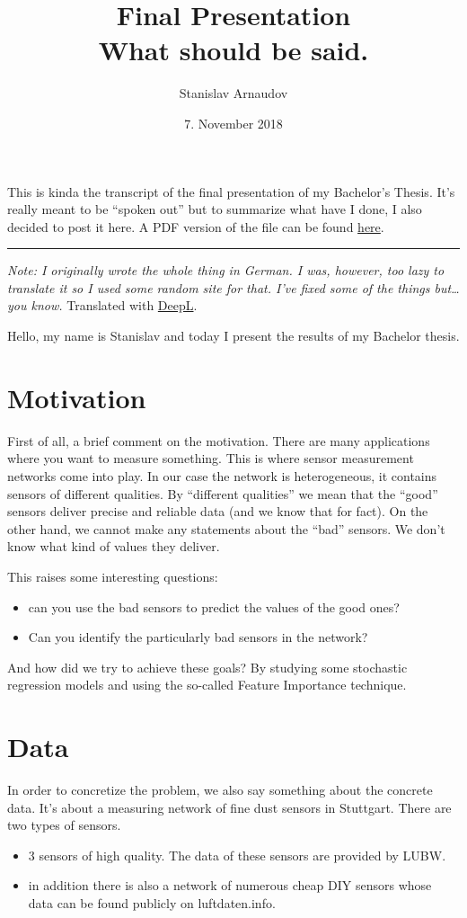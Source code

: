 \documentclass[margin=0.01in]{article}
\author{Stanislav Arnaudov}
\date{7. November 2018}
\title{Final Presentation\\\medskip
\large What should be said.}
\begin{document}
\maketitle
This is kinda the transcript of the final presentation of my Bachelor's Thesis. It's really meant to be ``spoken out'' but to summarize what have I done, I also decided to post it here. A PDF version of the file can be found \href{final-pres-english.pdf}{here}.

\noindent\rule{\textwidth}{0.5pt}
\emph{Note: I originally wrote the whole thing in German. I was, however, too lazy to translate it so I used some random site for that. I've fixed some of the things but\ldots{} you know.} Translated with \href{https://www.deepl.com/translator}{DeepL}.

Hello, my name is Stanislav and today I present the results of my Bachelor thesis.
\section{Motivation}
\label{sec:org4a8c4b0}


First of all, a brief comment on the motivation. There are many applications where you want to measure something. This is where sensor measurement networks come into play. In our case the network is heterogeneous, it contains sensors of different qualities. By ``different qualities'' we mean that the ``good'' sensors deliver precise and reliable data (and we know that for fact). On the other hand, we cannot make any statements about the ``bad'' sensors. We don't know what kind of values they deliver.

This raises some interesting questions:
\begin{itemize}
\item can you use the bad sensors to predict the values of the good ones?
\item Can you identify the particularly bad sensors in the network?
\end{itemize}

And how did we try to achieve these goals? By studying some stochastic regression models and using the so-called Feature Importance technique.

\section{Data}
\label{sec:org44f3ea9}

In order to concretize the problem, we also say something about the concrete data. It's about a measuring network of fine dust sensors in Stuttgart. There are two types of sensors. 
\begin{itemize}
\item 3 sensors of high quality. The data of these sensors are provided by LUBW.
\item in addition there is also a network of numerous cheap DIY sensors whose data can be found publicly on luftdaten.info.
\end{itemize}
\end{document}
